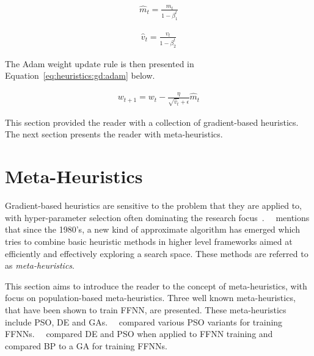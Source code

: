 \begin{equation}
      \label{eq:heuristics:gd:adam_bc_first_moment}
      \begin{split}
            \hat{m}_{t} = \frac{m_{t}}{1 - \beta^{t}_{1}}
      \end{split}
\end{equation}

\begin{equation}
      \label{eq:heuristics:gd:adam_bc_second_moment}
      \begin{split}
            \hat{v}_{t} = \frac{v_{t}}{1 - \beta^{t}_{2}}
      \end{split}
\end{equation}

\noindent
The \acs{Adam} weight update rule is then presented in Equation~\eqref{eq:heuristics:gd:adam} below.

\begin{equation}
      \label{eq:heuristics:gd:adam}
      \begin{split}
            w_{t+1} = w_{t} - \frac{\eta}{\sqrt{\hat{v}_{t}} + \epsilon}\hat{m}_{t}
      \end{split}
\end{equation}

\noindent
This section provided the reader with a collection of gradient-based heuristics. The next section presents the reader with meta-heuristics.

\section{Meta-Heuristics}
\label{sec:heuristics:mh}

Gradient-based heuristics are sensitive to the problem that they are applied to, with hyper-parameter selection often dominating the research focus~\cite{ref:bengio:2000, ref:feurer:2019}.~\citeauthor{ref:blum:2003}~\cite{ref:blum:2003} mentions that since the 1980's, a new kind of approximate algorithm has emerged which tries to combine basic heuristic methods in higher level frameworks aimed at efficiently and effectively exploring a search space. These methods are referred to as \textit{meta-heuristics}.

This section aims to introduce the reader to the concept of meta-heuristics, with focus on population-based meta-heuristics. Three well known meta-heuristics, that have been shown to train \acs{FFNN}, are presented. These meta-heuristics include \acf{PSO}, \acf{DE} and \acfp{GA}.~\citeauthor{ref:carvalho:2006}~\cite{ref:carvalho:2006} compared various \acs{PSO} variants for training \acp{FFNN}.~\citeauthor{ref:espinal:2011}~\cite{ref:espinal:2011} compared \acs{DE} and \acs{PSO} when applied to \acs{FFNN} training and~\citeauthor{ref:gupta:1999}~\cite{ref:gupta:1999} compared \acs{BP} to a \acs{GA} for training \acp{FFNN}.

